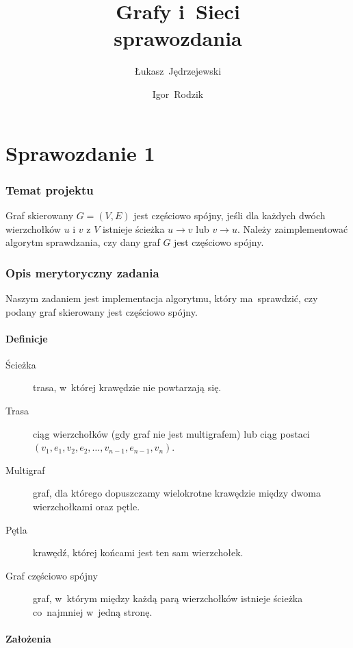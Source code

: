 \documentclass[a4paper,12pt]{mwart}
\title{
    Grafy i~Sieci \\
    sprawozdania
}
\author{
    Łukasz~Jędrzejewski
    \and
    Igor~Rodzik
}
\date{}
\begin{document}
\maketitle

\part{Sprawozdanie 1}

\section{Temat projektu}

Graf skierowany $G=(V,E)$ jest częściowo spójny, jeśli dla każdych dwóch
wierzchołków $u$ i $v$ z $V$ istnieje ścieżka $u \to v$ lub $v \to u$. Należy
zaimplementować algorytm sprawdzania, czy dany graf $G$ jest częściowo spójny.

\section{Opis merytoryczny zadania}

Naszym zadaniem jest implementacja algorytmu, który ma~sprawdzić, czy podany
graf skierowany jest częściowo spójny.

\subsection{Definicje}

\begin{description}
\item[Ścieżka] trasa, w~której krawędzie nie powtarzają się.
\item[Trasa] ciąg wierzchołków (gdy graf nie jest multigrafem) lub ciąg
  postaci $(v_1,e_1,v_2,e_2,\ldots, v_{n-1}, e_{n-1}, v_n)$.
\item[Multigraf] graf, dla którego dopuszczamy wielokrotne krawędzie między
  dwoma wierzchołkami oraz pętle.
\item[Pętla] krawędź, której końcami jest ten sam wierzchołek.
\item[Graf częściowo spójny] graf, w~którym między każdą parą wierzchołków
  istnieje ścieżka co~najmniej w~jedną stronę.
\end{description}

\subsection{Założenia}
\end{document}
